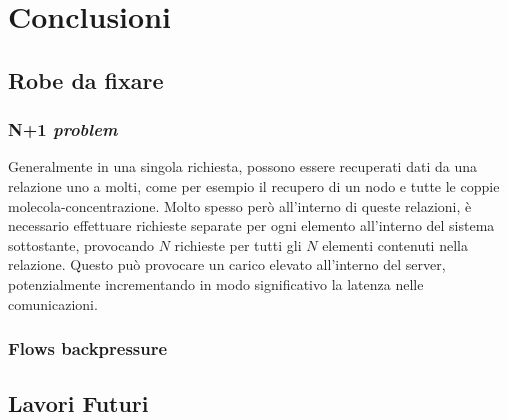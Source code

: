 \chapter{Conclusioni}\label{chap:conclusions}

\section{Robe da fixare}

\subsection{N+1 \textit{problem}}
Generalmente in una singola richiesta, possono essere recuperati dati da una relazione uno a molti, come per esempio il recupero di un nodo e tutte le coppie molecola-concentrazione.
Molto spesso però all'interno di queste relazioni, è necessario effettuare richieste separate per ogni elemento all'interno del sistema sottostante, provocando $N$ richieste per tutti
gli $N$ elementi contenuti nella relazione. Questo può provocare un carico elevato all'interno del server, potenzialmente incrementando in modo significativo la latenza nelle comunicazioni.

\subsection{Flows backpressure}\label{ssec:backpressure}

\section{Lavori Futuri}\label{sec:future-works}

